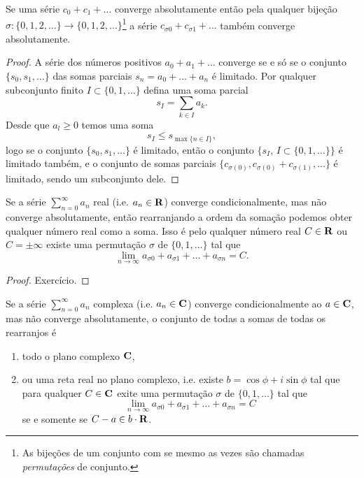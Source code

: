 \begin{lema}
\label{l:rearranjo-absoluto}
Se uma série $c_0 + c_1 + \dots$ converge absolutamente então pela qualquer
bijeção $\sigma: \{0,1,2,\dots\} \to \{0,1,2,\dots\}$\footnote{As bijeções
de um conjunto com se mesmo as vezes são chamadas \emph{permutações} de conjunto.}
a série $c_{\sigma 0} + c_{\sigma 1} + \dots$ também converge absolutamente.
\end{lema}
\begin{proof}
A série dos números positivos $a_0 + a_1 + \dots$ converge se e só se
o conjunto $\{s_0,s_1,\dots\}$ das somas parciais $s_n = a_0 + \dots + a_n$ é limitado.
Por qualquer subconjunto finito $I \subset \{0,1,\dots\}$
defina uma soma parcial
\[ s_I = \sum_{k\in I} a_k. \]
Desde que $a_l\geq 0$ temos uma soma
\[ s_I \leq s_{\max \{n\in I\}}, \]
logo se o conjunto $\{s_0,s_1,\dots\}$ é limitado,
então o conjunto $\{s_I,\,I\subset\{0,1,\dots \}\}$ é limitado também,
e o  conjunto de somas parciais $\{c_{\sigma(0)},c_{\sigma(0)} + c_{\sigma(1)},\dots\}$
é limitado, sendo um subconjunto dele.
\end{proof}

\begin{teorema}
\label{t:riemann-dini}
Se a série $\sum_{n=0}^\infty a_n$ real (i.e. $a_n\in\mathbf{R}$)
converge condicionalmente, mas não converge absolutamente,
então rearranjando a ordem da somação podemos obter
qualquer número real como a soma.
Isso é pelo qualquer número real $C\in\mathbf{R}$ ou $C = \pm \infty$
existe uma permutação $\sigma$ de $\{0,1,\dots\}$ tal que
\[ \lim_{n\to\infty} a_{\sigma 0} + a_{\sigma 1} + \dots + a_{\sigma n} = C. \]
\end{teorema}
\begin{proof}
Exercício.
\end{proof}

\begin{teorema}
\label{t:levy-steinitz}
Se a série $\sum_{n=0}^\infty a_n$ complexa (i.e. $a_n\in\mathbf{C}$)
converge condicionalmente ao $a\in \mathbf{C}$, mas não converge absolutamente,
o conjunto de todas a somas de todas os rearranjos é
\begin{enumerate}
\item todo o plano complexo $\mathbf{C}$,
\item ou uma reta real no plano complexo, i.e. existe $b = \cos \phi + i \sin \phi$ tal que
para qualquer $C\in\mathbf{C}$ exite uma permutação $\sigma$ de $\{0,1,\dots\}$ tal que
\[ \lim_{n\to\infty} a_{\sigma 0} + a_{\sigma 1} + \dots + a_{\sigma n} = C \] 
se e somente se $C-a \in b \cdot \mathbf{R}$.
\end{enumerate}
\end{teorema}


